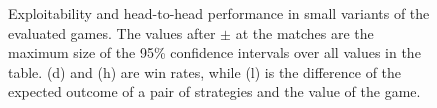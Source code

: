 \documentclass{aamas2015}
\begin{document}
\begin{figure}[t]
{\begin{minipage}{0.24\textwidth}
\end{minipage}}
\caption{Exploitability and head-to-head performance in small variants of the evaluated games. The values after $\pm$ at the matches are the maximum size of the 95\% confidence intervals over all values in the table. (d) and (h) are win rates, while (l) is the difference of the  expected outcome of a pair of strategies and the value of the game.}\label{fig:small}
\end{figure}
\end{document}
